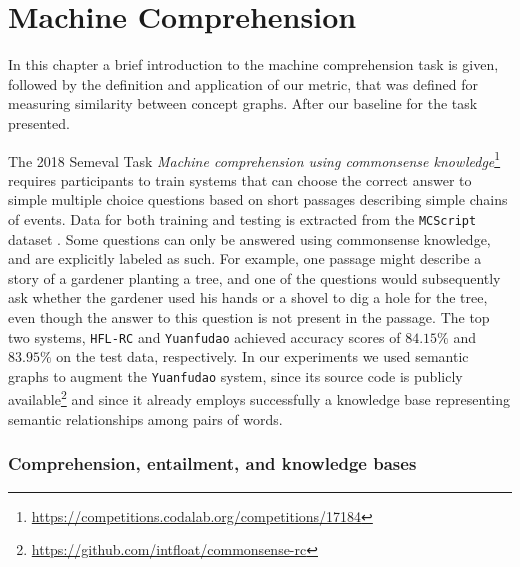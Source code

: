 \chapter{Machine Comprehension}
\label{chap:comprehension}
In this chapter a brief introduction to the machine comprehension task is given, followed by the definition and application of our metric, that was defined for measuring similarity between concept graphs. After our baseline for the task presented.

The 2018 Semeval Task \textit{Machine comprehension using commonsense
	knowledge}\footnote{\url{https://competitions.codalab.org/competitions/17184}}
requires participants to train systems that can choose the
correct answer to simple multiple choice questions based on short
passages describing simple chains of events. Data for both training and
testing is extracted from the \texttt{MCScript} dataset
\cite{Ostermann:2018}. Some questions can only be
answered using commonsense knowledge, and are
explicitly labeled as such. For example, one passage might describe a
story of a gardener planting a tree, and one of the questions would
subsequently ask whether the gardener used his hands or a shovel to dig
a hole for the tree, even though the answer to this question is not
present in the passage. The top two systems, \texttt{HFL-RC}
\cite{Chen:2018} and
\texttt{Yuanfudao} \cite{Wang:2018} achieved accuracy scores of
$84.15\%$ and $83.95\%$ on the test data, respectively. In our experiments we used
semantic graphs to augment the \texttt{Yuanfudao} system, since its source
code is publicly
available\footnote{\url{https://github.com/intfloat/commonsense-rc}} and since it already employs successfully a
knowledge base representing semantic relationships among pairs of words.

\subsection{Comprehension, entailment, and knowledge bases}

